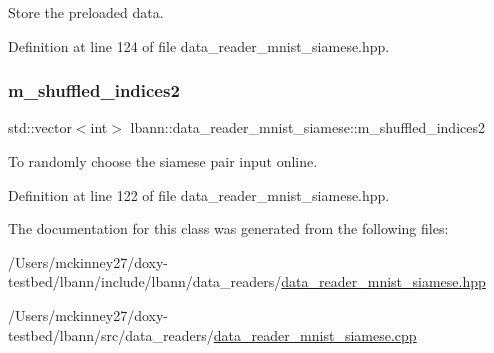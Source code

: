 Store the preloaded data. 



Definition at line 124 of file data\+\_\+reader\+\_\+mnist\+\_\+siamese.\+hpp.

\mbox{\label{classlbann_1_1data__reader__mnist__siamese_a42a4b1513a7305cc62d219ac0d9473c3}} 
\subsubsection{\texorpdfstring{m\+\_\+shuffled\+\_\+indices2}{m\_shuffled\_indices2}}
{\footnotesize\ttfamily std\+::vector$<$int$>$ lbann\+::data\+\_\+reader\+\_\+mnist\+\_\+siamese\+::m\+\_\+shuffled\+\_\+indices2\hspace{0.3cm}{\ttfamily [protected]}}



To randomly choose the siamese pair input online. 



Definition at line 122 of file data\+\_\+reader\+\_\+mnist\+\_\+siamese.\+hpp.



The documentation for this class was generated from the following files\+:\begin{DoxyCompactItemize}
\item 
/\+Users/mckinney27/doxy-\/testbed/lbann/include/lbann/data\+\_\+readers/\hyperlink{data__reader__mnist__siamese_8hpp}{data\+\_\+reader\+\_\+mnist\+\_\+siamese.\+hpp}\item 
/\+Users/mckinney27/doxy-\/testbed/lbann/src/data\+\_\+readers/\hyperlink{data__reader__mnist__siamese_8cpp}{data\+\_\+reader\+\_\+mnist\+\_\+siamese.\+cpp}\end{DoxyCompactItemize}
